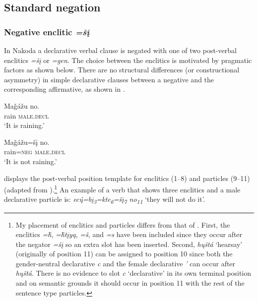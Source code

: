\documentclass[output=paper,colorlinks,citecolor=brown]{langscibook}
\begin{document}
\subsection{Standard negation}\label{sec:nak:2.1}

\subsubsection{Negative enclitic \textit{=šį}}\label{sec:nak:2.1.1}

In Nakoda a declarative verbal clause is negated with one of two post-verbal enclitics \textit{=šį} or \textit{=gen}. The choice between the enclitics is motivated by pragmatic factors as shown below. There are no structural differences (or constructional asymmetry) in simple declarative clauses between a negative and the corresponding affirmative, as shown in .

\ea\label{ex:nak:1}
    \ea\label{ex:nak:1a}
        \gll Maǧážu no. \\ 
             rain \textsc{male.decl} \\
        \glt ‘It is raining.’
    
    \ex\label{ex:nak:1b}
        \gll Maǧážu=šį no. \\
             rain=\textsc{neg} \textsc{male.decl}\\
        \glt ‘It is not raining.’
    \z
\z 

 displays the post-verbal position template for enclitics (1--8) and particles (9--11) (adapted from \citealt[310]{Cumberland2005}).\footnote{My placement of enclitics and particles differs from that of \citet[310]{Cumberland2005}. First, the enclitics \textit{=ȟ}, \textit{=ȟtįyą}, \textit{=š}, and \textit{=s} have been included since they occur after the negator \textit{=šį} so an extra slot has been inserted. Second, \textit{hųštá} ‘hearsay’ (originally of position 11) can be assigned to position 10 since both the gender-neutral declarative \textit{c} and the female declarative \textit{’} can occur after \textit{hųštá}. There is no evidence to slot \textit{c} ‘declarative’ in its own terminal position and on semantic grounds it should occur in position 11 with the rest of the sentence type particles.} An example of a verb that shows three enclitics and a male declarative particle is: \textit{ec\'{ų}=bį\textsubscript{3}=kte\textsubscript{6}=šį\textsubscript{7} no\textsubscript{11}} ‘they will not do it’.
\end{document}
